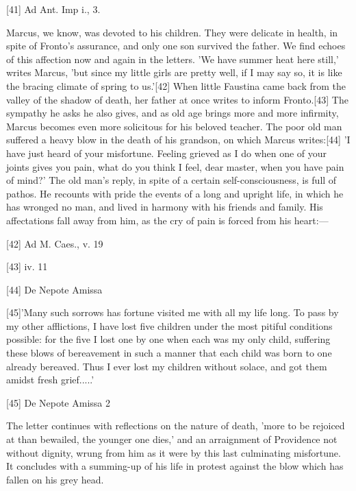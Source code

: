 [41]
Ad Ant. Imp i., 3.

Marcus, we know, was devoted to his children. They were delicate in
health, in spite of Fronto's assurance, and only one son survived the
father. We find echoes of this affection now and again in the letters. 'We
have summer heat here still,' writes Marcus, 'but since my little girls
are pretty well, if I may say so, it is like the bracing climate of spring
to us.'[42]
When little Faustina came back from the valley of the shadow of death,
her father at once writes to inform Fronto.[43]
The sympathy he asks he also gives, and as old age brings more and more
infirmity, Marcus becomes even more solicitous for his beloved teacher.
The poor old man suffered a heavy blow in the death of his grandson, on
which Marcus writes:[44]
'I have just heard of your misfortune. Feeling grieved as I do when one
of your joints gives you pain, what do you think I feel, dear master,
when you have pain of mind?' The old man's reply, in spite of a certain
self-consciousness, is full of pathos. He recounts with pride the events
of a long and upright life, in which he has wronged no man, and lived in
harmony with his friends and family. His affectations fall away from him,
as the cry of pain is forced from his heart:—

[42]
Ad M. Caes., v. 19

[43]
iv. 11

[44]
De Nepote Amissa

[45]'Many
such sorrows has fortune visited me with all my life long. To pass by my
other afflictions, I have lost five children under the most pitiful
conditions possible: for the five I lost one by one when each was my only
child, suffering these blows of bereavement in such a manner that each
child was born to one already bereaved. Thus I ever lost my children
without solace, and got them amidst fresh grief.....'

[45]
De Nepote Amissa 2

The letter continues with reflections on the nature of death, 'more to be
rejoiced at than bewailed, the younger one dies,' and an arraignment of
Providence not without dignity, wrung from him as it were by this last
culminating misfortune. It concludes with a summing-up of his life in
protest against the blow which has fallen on his grey head.

